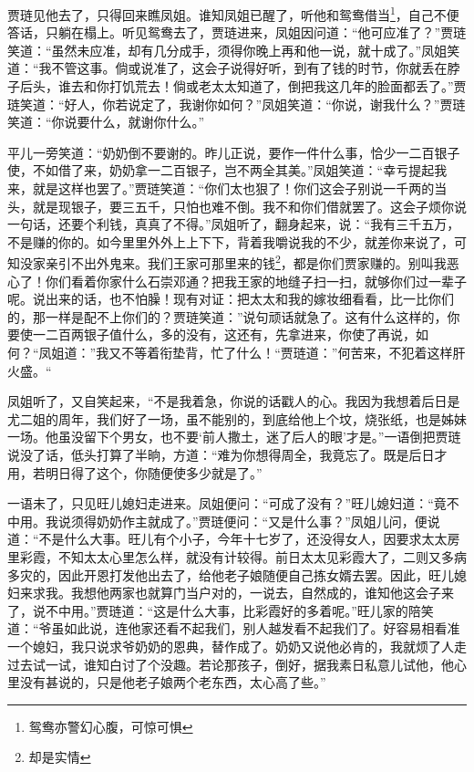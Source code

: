 \documentclass[12pt,oneside]{book}
\begin{document}
贾琏见他去了，只得回来瞧凤姐。谁知凤姐已醒了，听他和鸳鸯借当\footnote{鸳鸯亦警幻心腹，可惊可惧}，自己不便答话，只躺在榻上。听见鸳鸯去了，贾琏进来，凤姐因问道：“他可应准了？”贾琏笑道：“虽然未应准，却有几分成手，须得你晚上再和他一说，就十成了。”凤姐笑道：“我不管这事。倘或说准了，这会子说得好听，到有了钱的时节，你就丢在脖子后头，谁去和你打饥荒去！倘或老太太知道了，倒把我这几年的脸面都丢了。”贾琏笑道：“好人，你若说定了，我谢你如何？”凤姐笑道：“你说，谢我什么？”贾琏笑道：“你说要什么，就谢你什么。”

平儿一旁笑道：“奶奶倒不要谢的。昨儿正说，要作一件什么事，恰少一二百银子使，不如借了来，奶奶拿一二百银子，岂不两全其美。”凤姐笑道：“幸亏提起我来，就是这样也罢了。”贾琏笑道：“你们太也狠了！你们这会子别说一千两的当头，就是现银子，要三五千，只怕也难不倒。我不和你们借就罢了。这会子烦你说一句话，还要个利钱，真真了不得。”凤姐听了，翻身起来，说：“我有三千五万，不是赚的你的。如今里里外外上上下下，背着我嚼说我的不少，就差你来说了，可知没家亲引不出外鬼来。我们王家可那里来的钱\footnote{却是实情}，都是你们贾家赚的。别叫我恶心了！你们看着你家什么石崇邓通？把我王家的地缝子扫一扫，就够你们过一辈子呢。说出来的话，也不怕臊！现有对证：把太太和我的嫁妆细看看，比一比你们的，那一样是配不上你们的？贾琏笑道：”说句顽话就急了。这有什么这样的，你要使一二百两银子值什么，多的没有，这还有，先拿进来，你使了再说，如何？“凤姐道：”我又不等着衔垫背，忙了什么！“贾琏道：”何苦来，不犯着这样肝火盛。“

凤姐听了，又自笑起来，“不是我着急，你说的话戳人的心。我因为我想着后日是尤二姐的周年，我们好了一场，虽不能别的，到底给他上个坟，烧张纸，也是姊妹一场。他虽没留下个男女，也不要‘前人撒土，迷了后人的眼’才是。”一语倒把贾琏说没了话，低头打算了半晌，方道：“难为你想得周全，我竟忘了。既是后日才用，若明日得了这个，你随便使多少就是了。”

一语未了，只见旺儿媳妇走进来。凤姐便问：“可成了没有？”旺儿媳妇道：“竟不中用。我说须得奶奶作主就成了。”贾琏便问：“又是什么事？”凤姐儿问，便说道：“不是什么大事。旺儿有个小子，今年十七岁了，还没得女人，因要求太太房里彩霞，不知太太心里怎么样，就没有计较得。前日太太见彩霞大了，二则又多病多灾的，因此开恩打发他出去了，给他老子娘随便自己拣女婿去罢。因此，旺儿媳妇来求我。我想他两家也就算门当户对的，一说去，自然成的，谁知他这会子来了，说不中用。”贾琏道：“这是什么大事，比彩霞好的多着呢。”旺儿家的陪笑道：“爷虽如此说，连他家还看不起我们，别人越发看不起我们了。好容易相看准一个媳妇，我只说求爷奶奶的恩典，替作成了。奶奶又说他必肯的，我就烦了人走过去试一试，谁知白讨了个没趣。若论那孩子，倒好，据我素日私意儿试他，他心里没有甚说的，只是他老子娘两个老东西，太心高了些。”
\end{document}
